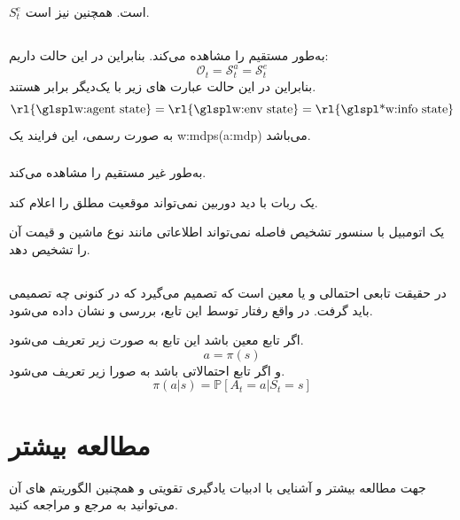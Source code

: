 \begin{remark}
	 $S_t^e$   است.
	همچنین 
	 نیز  است.
\end{remark}


\subsection{}

\subsubsection{}

به‌طور مستقیم  را مشاهده می‌کند. بنابراین در این حالت داریم:
	\[
		\mathcal{O}_t = \mathcal{S}_t^a = \mathcal{S}_t^e
	\]
بنابراین در این حالت عبارت های زیر با یک‌دیگر برابر هستند.
	\[
	\text{\rl{\w{agent state}}} = \text{\rl{\w{env state}}} = \text{\rl{\ws{info state}}}
	\]
به صورت رسمی، این فرایند یک \Glspl{w:mdp}(\gls*{a:mdp}) می‌باشد.
\cite{Sutton1998}
	

\subsubsection{}
 به‌طور غیر مستقیم  را مشاهده می‌کند.
\begin{example}
			یک ربات با دید دوربین نمی‌تواند موقعیت مطلق را اعلام کند.		
\end{example}
\begin{example}
	یک اتومبیل با سنسور تشخیص فاصله نمی‌تواند اطلاعاتی مانند نوع ماشین و قیمت آن را تشخیص دهد.
\end{example}

\subsection{}
در حقیقت تابعی احتمالی و یا معین است که تصمیم می‌گیرد که در  کنونی چه تصمیمی باید گرفت. در واقع رفتار  توسط این تابع، بررسی و نشان داده می‌شود.

\begin{definition}
	اگر تابع معین باشد این تابع به صورت زیر تعریف می‌شود.
$$
a = \pi(s)
$$
و اگر تابع احتمالاتی باشد به صورا زیر تعریف می‌شود.
$$
\pi(a | s)=\mathbb{P}\left[A_{t}=a | S_{t}=s\right]
$$
\end{definition}


\section{مطالعه بیشتر}
جهت مطالعه بیشتر و آشنایی با ادبیات یادگیری تقویتی و همچنین الگوریتم های آن می‌توانید به مرجع  \cite{Sutton1998} و \cite{uclRL}
مراجعه کنید.







